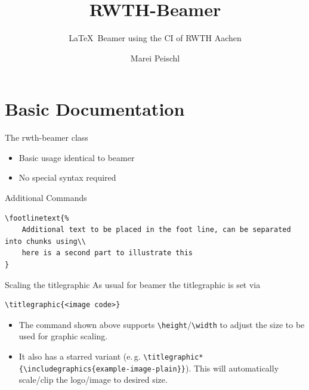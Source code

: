 \documentclass[
english,%
]{rwth-beamer}
\title{RWTH-Beamer}
\subtitle{\LaTeX~Beamer using the CI of RWTH Aachen}
\author[M. Peischl]{Marei Peischl}
\institute{pei\TeX}
\newcommand*{\code}[1]{\texttt{#1}}
\begin{document}
\maketitle

\maketitle[titlegraphic=2:3]

\section{Basic Documentation}

\begin{frame}{The rwth-beamer class}
\begin{itemize}
\item Basic usage identical to beamer
\item No special syntax required
\end{itemize}
\end{frame}

\begin{frame}[fragile]{Additional Commands}
\begin{verbatim}
\footlinetext{%
	Additional text to be placed in the foot line, can be separated into chunks using\\
	here is a second part to illustrate this
}
\end{verbatim}
\end{frame}

\begin{frame}[fragile]{Scaling the titlegraphic}
As usual for beamer the titlegraphic is set via

\begin{verbatim}
\titlegraphic{<image code>}
\end{verbatim}

\begin{itemize}
\item The command shown above supports \code{\textbackslash{}height}/\code{\textbackslash{}width} to adjust the size to be used for graphic scaling.
\item It also has  a starred variant (e.\,g. \code{\textbackslash{}titlegraphic*\{\textbackslash{}includegraphics\{example-image-plain\}\}}). This will automatically scale/clip the logo/image to desired size.
\end{itemize}
\end{frame}
\end{document}
